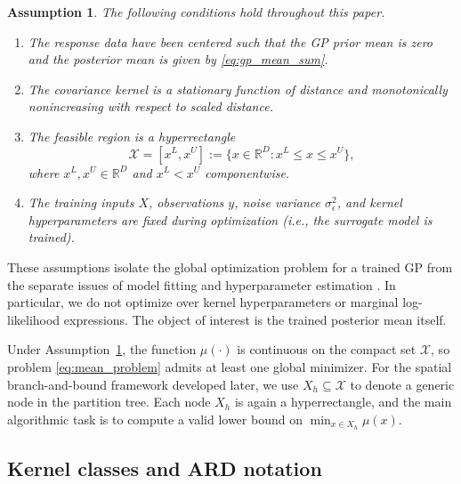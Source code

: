 \documentclass[pdflatex,sn-mathphys-num]{sn-jnl}%
\theoremstyle{thmstyleone}%
\theoremstyle{thmstyletwo}%
\newtheorem{assumption}{Assumption}%
\theoremstyle{thmstylethree}%
\begin{document}
\begin{assumption}
\label{assump:standing}
The following conditions hold throughout this paper.
\begin{enumerate}
    \item The response data have been centered such that the GP prior mean is zero and the posterior mean is given by \eqref{eq:gp_mean_sum}.
    \item The covariance kernel is a stationary function of distance and monotonically nonincreasing with respect to scaled distance.
    \item The feasible region is a hyperrectangle
    \[
    \mathcal{X}=[x^L,x^U]:=\{x\in\mathbb{R}^D: x^L\le x\le x^U\},
    \]
    where $x^L,x^U\in\mathbb{R}^D$ and $x^L<x^U$ componentwise.
    \item The training inputs $X$, observations $y$, noise variance $\sigma_\epsilon^2$, and kernel hyperparameters are fixed during optimization (i.e., the surrogate model is trained).
\end{enumerate}
\end{assumption}

These assumptions isolate the global optimization problem for a trained GP from the separate issues of model fitting and hyperparameter estimation \cite{ref:gp_book,ref:gp_regression_review}. In particular, we do not optimize over kernel hyperparameters or marginal log-likelihood expressions. The object of interest is the trained posterior mean itself.

Under Assumption~\ref{assump:standing}, the function $\mu(\cdot)$ is continuous on the compact set $\mathcal{X}$, so problem \eqref{eq:mean_problem} admits at least one global minimizer. For the spatial branch-and-bound framework developed later, we use $X_h\subseteq \mathcal{X}$ to denote a generic node in the partition tree. Each node $X_h$ is again a hyperrectangle, and the main algorithmic task is to compute a valid lower bound on $\min_{x\in X_h}\mu(x)$.

\subsection{Kernel classes and ARD notation}
\end{document}
